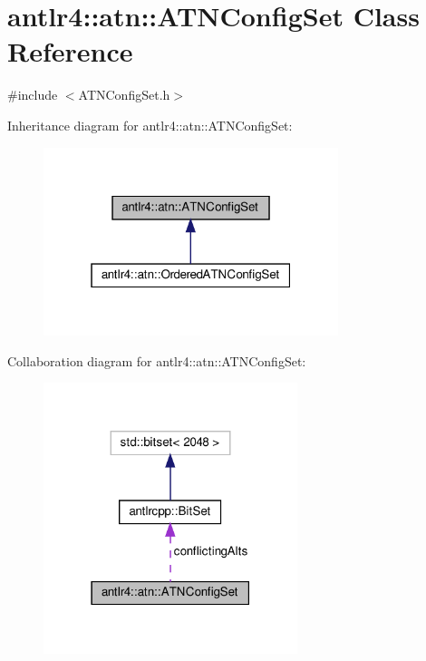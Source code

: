\hypertarget{classantlr4_1_1atn_1_1ATNConfigSet}{}\section{antlr4\+:\+:atn\+:\+:A\+T\+N\+Config\+Set Class Reference}
\label{classantlr4_1_1atn_1_1ATNConfigSet}


{\ttfamily \#include $<$A\+T\+N\+Config\+Set.\+h$>$}



Inheritance diagram for antlr4\+:\+:atn\+:\+:A\+T\+N\+Config\+Set\+:
\nopagebreak
\begin{figure}[H]
\begin{center}
\leavevmode
\includegraphics[width=244pt]{classantlr4_1_1atn_1_1ATNConfigSet__inherit__graph}
\end{center}
\end{figure}


Collaboration diagram for antlr4\+:\+:atn\+:\+:A\+T\+N\+Config\+Set\+:
\nopagebreak
\begin{figure}[H]
\begin{center}
\leavevmode
\includegraphics[width=210pt]{classantlr4_1_1atn_1_1ATNConfigSet__coll__graph}
\end{center}
\end{figure}
